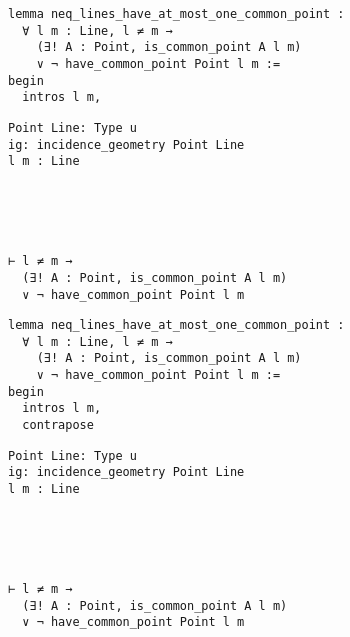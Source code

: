 \begin{frame}[fragile]
	\begin{multicols}{2}
		\begin{lstlisting}
lemma neq_lines_have_at_most_one_common_point :
  ∀ l m : Line, l ≠ m → 
    (∃! A : Point, is_common_point A l m) 
    ∨ ¬ have_common_point Point l m := 
begin
  intros l m,
\end{lstlisting}
		\columnbreak
		\begin{lstlisting}
Point Line: Type u
ig: incidence_geometry Point Line
l m : Line





⊢ l ≠ m → 
  (∃! A : Point, is_common_point A l m) 
  ∨ ¬ have_common_point Point l m
		\end{lstlisting}
	\end{multicols}
\end{frame}










\begin{frame}[fragile]
	\begin{multicols}{2}
		\begin{lstlisting}
lemma neq_lines_have_at_most_one_common_point :
  ∀ l m : Line, l ≠ m → 
    (∃! A : Point, is_common_point A l m) 
    ∨ ¬ have_common_point Point l m := 
begin
  intros l m,
  contrapose
\end{lstlisting}
		\columnbreak
		\begin{lstlisting}
Point Line: Type u
ig: incidence_geometry Point Line
l m : Line





⊢ l ≠ m → 
  (∃! A : Point, is_common_point A l m) 
  ∨ ¬ have_common_point Point l m
		\end{lstlisting}
	\end{multicols}
\end{frame}










